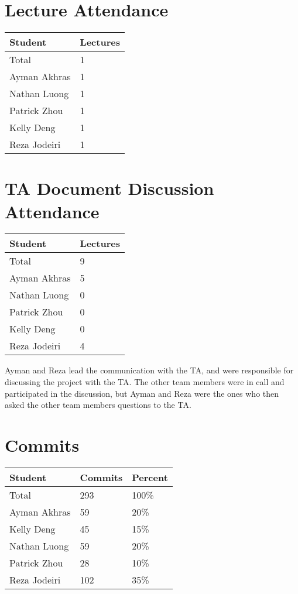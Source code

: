 \documentclass{article}
\begin{document}
\section{Lecture Attendance}

\begin{table}[H]
\centering
\begin{tabular}{ll}
\toprule
\textbf{Student} & \textbf{Lectures}\\
\midrule
Total & 1\\
Ayman Akhras & 1\\
Nathan Luong & 1\\
Patrick Zhou & 1\\
Kelly Deng & 1\\
Reza Jodeiri & 1\\
\bottomrule
\end{tabular}
\end{table}

\section{TA Document Discussion Attendance}

\begin{table}[H]
\centering
\begin{tabular}{ll}
\toprule
\textbf{Student} & \textbf{Lectures}\\
\midrule
Total & 9\\
Ayman Akhras & 5\\
Nathan Luong & 0\\
Patrick Zhou & 0\\
Kelly Deng & 0\\
Reza Jodeiri & 4\\
\bottomrule
\end{tabular}
\end{table}

Ayman and Reza lead the communication with the TA, and were responsible for discussing the project with the TA. The other team members were in call and participated in the discussion, but Ayman and Reza were the ones who then asked the other team members questions to the TA.
\section{Commits}

\begin{table}[H]
\centering
\begin{tabular}{lll}
\toprule
\textbf{Student} & \textbf{Commits} & \textbf{Percent}\\
\midrule
Total & 293 & 100\% \\
Ayman Akhras & 59 & 20\%\\
Kelly Deng & 45 & 15\%\\
Nathan Luong & 59 & 20\%\\
Patrick Zhou & 28 & 10\%\\
Reza Jodeiri & 102 & 35\%\\
\bottomrule
\end{tabular}
\end{table}
\end{document}
